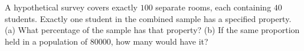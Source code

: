 A hypothetical survey covers exactly $100$ separate rooms, each containing $40$ students. Exactly one student in the combined sample has a specified property. (a) What percentage of the sample has that property? (b) If the same proportion held in a population of $80000$, how many would have it?
